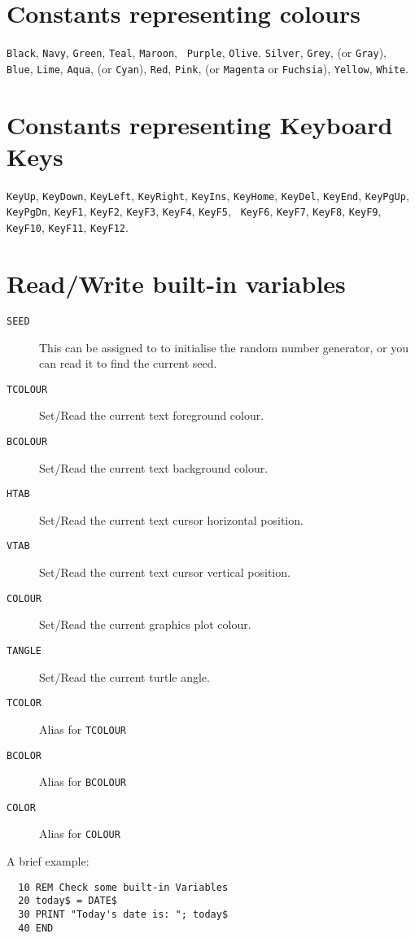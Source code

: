 \section{Constants representing colours}
{\tt Black}, {\tt Navy}, {\tt Green}, {\tt Teal}, {\tt Maroon}, {\tt
Purple}, {\tt Olive}, {\tt Silver},
{\tt Grey}, (or {\tt Gray}), 
{\tt Blue}, {\tt Lime},
{\tt Aqua}, (or {\tt Cyan}),
{\tt Red},
{\tt Pink}, (or {\tt Magenta} or {\tt Fuchsia}),
{\tt Yellow}, {\tt White}.

\section{Constants representing Keyboard Keys}
{\tt KeyUp}, {\tt KeyDown}, {\tt KeyLeft}, {\tt KeyRight}, {\tt KeyIns},
{\tt KeyHome}, {\tt KeyDel}, {\tt KeyEnd}, {\tt KeyPgUp}, {\tt KeyPgDn},
{\tt KeyF1}, {\tt KeyF2}, {\tt KeyF3}, {\tt KeyF4}, {\tt KeyF5}, {\tt
KeyF6}, {\tt KeyF7}, {\tt KeyF8}, {\tt KeyF9}, {\tt KeyF10}, {\tt KeyF11},
{\tt KeyF12}.

\section{Read/Write built-in variables}
\begin{description}
\item[{\tt SEED}] This can be assigned to to initialise
the random number generator, or you can read it to find the current
seed.
\item[{\tt TCOLOUR}] Set/Read the current text foreground
colour.
\item[{\tt BCOLOUR}] Set/Read the current text background
colour.
\item[{\tt HTAB}] Set/Read the current text cursor horizontal
position.
\item[{\tt VTAB}] Set/Read the current text cursor vertical
position.
\item[{\tt COLOUR}] Set/Read the current graphics plot colour.
\item[{\tt TANGLE}] Set/Read the current turtle angle.
\item[{\tt TCOLOR}] Alias for {\tt TCOLOUR}
\item[{\tt BCOLOR}] Alias for {\tt BCOLOUR}
\item[{\tt COLOR}] Alias for {\tt COLOUR}
\end{description}

A brief example:
\begin{verbatim}
  10 REM Check some built-in Variables
  20 today$ = DATE$
  30 PRINT "Today's date is: "; today$
  40 END
\end{verbatim}
